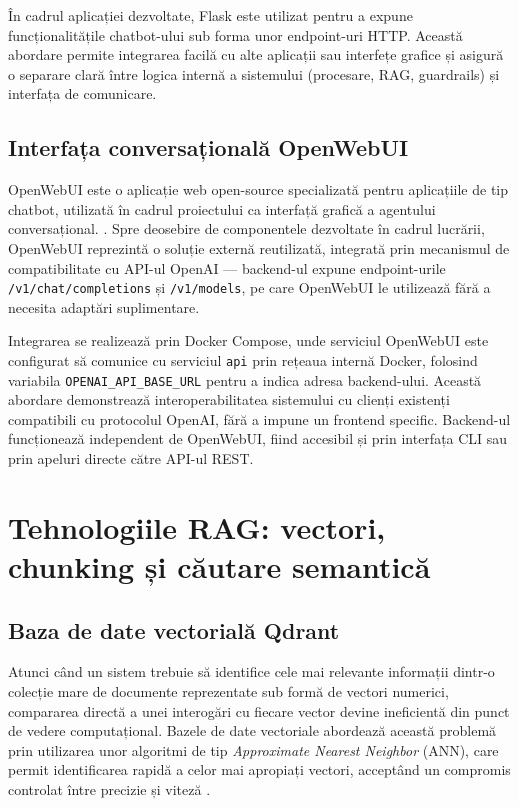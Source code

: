 \documentclass[12pt, a4paper, oneside, romanian]{teza-upb}
\begin{document}
În cadrul aplicației dezvoltate, Flask este utilizat pentru a expune funcționalitățile chatbot-ului sub forma unor endpoint-uri HTTP. Această abordare permite integrarea facilă cu alte aplicații sau interfețe grafice și asigură o separare clară între logica internă a sistemului (procesare, RAG, guardrails) și interfața de comunicare.

\subsection{Interfața conversațională OpenWebUI}

OpenWebUI este o aplicație web open-source specializată pentru aplicațiile de tip chatbot, utilizată în cadrul proiectului ca interfață grafică a agentului conversațional. \cite{openwebui_doc}. Spre deosebire de 
componentele dezvoltate în cadrul lucrării, OpenWebUI reprezintă o soluție 
externă reutilizată, integrată prin mecanismul de compatibilitate cu API-ul 
OpenAI — backend-ul expune endpoint-urile \texttt{/v1/chat/completions} și 
\texttt{/v1/models}, pe care OpenWebUI le utilizează fără a necesita adaptări 
suplimentare.

Integrarea se realizează prin Docker Compose, unde serviciul OpenWebUI este 
configurat să comunice cu serviciul \texttt{api} prin rețeaua internă Docker, 
folosind variabila \texttt{OPENAI\_API\_BASE\_URL} pentru a indica adresa 
backend-ului. Această abordare demonstrează interoperabilitatea sistemului cu 
clienți existenți compatibili cu protocolul OpenAI, fără a impune un frontend 
specific. Backend-ul funcționează independent de OpenWebUI, fiind accesibil 
și prin interfața CLI sau prin apeluri directe către API-ul REST.

\section{Tehnologiile RAG: vectori, chunking și căutare semantică}

\subsection{Baza de date vectorială Qdrant}

Atunci când un sistem trebuie să identifice cele mai relevante informații 
dintr-o colecție mare de documente reprezentate sub formă de vectori numerici, 
compararea directă a unei interogări cu fiecare vector devine ineficientă din punct de vedere computațional. 
Bazele de date vectoriale abordează această problemă prin utilizarea unor algoritmi de tip 
\textit{Approximate Nearest Neighbor} (ANN), care permit identificarea rapidă a celor mai apropiați vectori, 
acceptând un compromis controlat între precizie și viteză \cite{malkov2018hnsw}.
\end{document}
